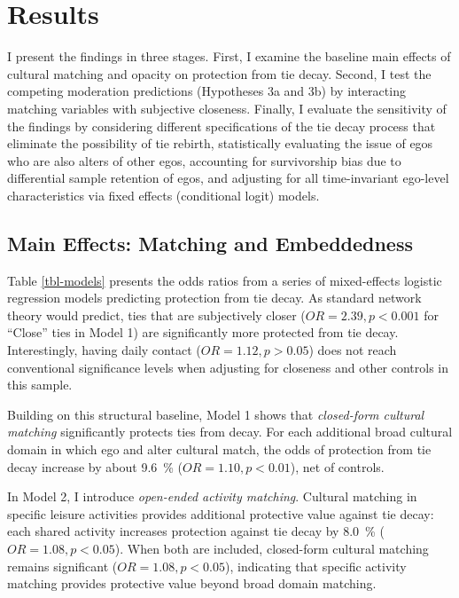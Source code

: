\documentclass[12pt,letterpaper]{article}
\def\percent{\%}%
\begin{document}
\section{Results}\label{results}

I present the findings in three stages. First, I examine the baseline main effects of cultural matching and opacity on protection from tie decay. Second, I test the competing moderation predictions (Hypotheses 3a and 3b) by interacting matching variables with subjective closeness. Finally, I evaluate the sensitivity of the findings by considering different specifications of the tie decay process that eliminate the possibility of tie rebirth, statistically evaluating the issue of egos who are also alters of other egos, accounting for survivorship bias due to differential sample retention of egos, and adjusting for all time-invariant ego-level characteristics via fixed effects (conditional logit) models. 

\subsection{Main Effects: Matching and Embeddedness}\label{main-effects}

Table \ref{tbl-models} presents the odds ratios from a series of mixed-effects logistic regression models predicting protection from tie decay. As standard network theory would predict, ties that are subjectively closer ($OR = 2.39, p < 0.001$ for ``Close'' ties in Model 1) are significantly more protected from tie decay. Interestingly, having daily contact ($OR = 1.12, p > 0.05$) does not reach conventional significance levels when adjusting for closeness and other controls in this sample.

Building on this structural baseline, Model 1 shows that \textit{closed-form cultural matching} significantly protects ties from decay. For each additional broad cultural domain in which ego and alter cultural match, the odds of protection from tie decay increase by about \SI{9.6}{\percent} ($OR = 1.10, p < 0.01$), net of controls.

In Model 2, I introduce \textit{open-ended activity matching}. Cultural matching in specific leisure activities provides additional protective value against tie decay: each shared activity increases protection against tie decay by \SI{8.0}{\percent} ($OR = 1.08, p < 0.05$). When both are included, closed-form cultural matching remains significant ($OR = 1.08, p < 0.05$), indicating that specific activity matching provides protective value beyond broad domain matching.
\end{document}

